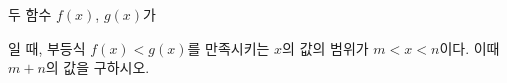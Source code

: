 두 함수 $f(x)$, $g(x)$가\par\smallskip{}\par\smallskip\noindent 일 때, 부등식 $f(x)<g(x)$를 만족시키는 $x$의 값의 범위가 $m<x<n$이다. 이때 $m+n$의 값을 구하시오.
